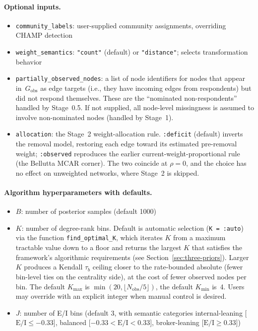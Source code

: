 \documentclass[11pt]{article}
\newcommand{\Gobs}{G_{\text{obs}}}
\newcommand{\EI}{\text{E/I}}
\begin{document}
\paragraph{Optional inputs.}
\begin{itemize}[leftmargin=*, itemsep=2pt]
  \item \texttt{community\_labels}: user-supplied community assignments, overriding CHAMP detection
  \item \texttt{weight\_semantics}: \texttt{"count"} (default) or \texttt{"distance"}; selects transformation behavior
  \item \texttt{partially\_observed\_nodes}: a list of node identifiers for nodes that appear in~$\Gobs$ as edge targets (i.e., they have incoming edges from respondents) but did not respond themselves. These are the ``nominated non-respondents'' handled by Stage~0.5. If not supplied, all node-level missingness is assumed to involve non-nominated nodes (handled by Stage~1).
  \item \texttt{allocation}: the Stage~2 weight-allocation rule. \texttt{:deficit} (default) inverts the removal model, restoring each edge toward its estimated pre-removal weight; \texttt{:observed} reproduces the earlier current-weight-proportional rule (the Bellutta MCAR corner). The two coincide at $\rho = 0$, and the choice has no effect on unweighted networks, where Stage~2 is skipped.
\end{itemize}

\paragraph{Algorithm hyperparameters with defaults.}
\begin{itemize}[leftmargin=*, itemsep=2pt]
  \item $B$: number of posterior samples (default 1000)
  \item $K$: number of degree-rank bins. Default is automatic selection (\texttt{K = :auto}) via the function \texttt{find\_optimal\_K}, which iterates $K$ from a maximum tractable value down to a floor and returns the largest $K$ that satisfies the framework's algorithmic requirements (see Section~\ref{sec:three-priors}). Larger $K$ produces a Kendall $\tau_b$ ceiling closer to the rate-bounded absolute (fewer bin-level ties on the centrality side), at the cost of fewer observed nodes per bin. The default $K_{\max}$ is $\min(20, \lfloor N_{\text{obs}} / 5 \rfloor)$, the default $K_{\min}$ is~4. Users may override with an explicit integer when manual control is desired.
  \item $J$: number of E/I bins (default 3, with semantic categories internal-leaning [$\EI \leq -0.33$], balanced [$-0.33 < \EI < 0.33$], broker-leaning [$\EI \geq 0.33$])
\end{itemize}
\end{document}
